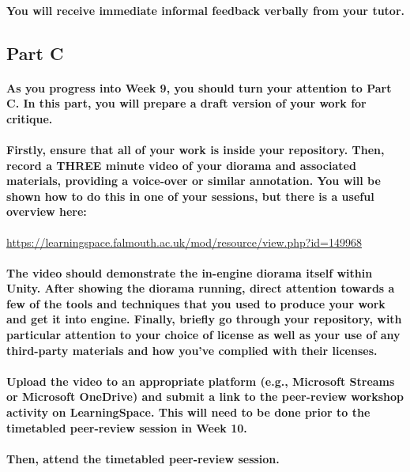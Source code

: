 \documentclass{../../fal_assignment}
\begin{document}
\paragraph{You will receive immediate \textbf{informal feedback} verbally from your \textbf{tutor}.}

\subsection*{Part C}

\paragraph{As you progress into Week 9, you should turn your attention to Part C. In this part, you will prepare a draft version of your work for critique.}

\paragraph{Firstly, ensure that all of your work is inside your repository. Then, record a \textbf{THREE} minute video of your diorama and associated materials, providing a voice-over or similar annotation. You will be shown how to do this in one of your sessions, but there is a useful overview here:}

\url{https://learningspace.falmouth.ac.uk/mod/resource/view.php?id=149968}

\paragraph{The video should demonstrate the in-engine diorama itself within Unity. After showing the diorama running, direct attention towards a few of the tools and techniques that you used to produce your work and get it into engine. Finally, briefly go through your repository, with particular attention to your choice of license as well as your use of any third-party materials and how you've complied with their licenses.}

\paragraph{Upload the video to an appropriate platform (e.g., Microsoft Streams or Microsoft OneDrive) and submit a link to the peer-review workshop activity on LearningSpace. This will need to be done prior to the timetabled peer-review session in Week 10.}

\paragraph{Then, attend the timetabled peer-review session.}
\end{document}
